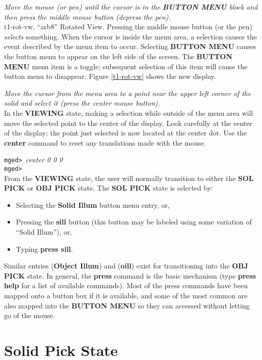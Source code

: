 \noindent
{\em Move the mouse (or pen) until the cursor is in the {\bf BUTTON MENU}
block and then press the middle mouse button (depress the pen).}\\

\mfig t1-rot-vw, ``arb8'' Rotated View.
Pressing the middle mouse button (or the pen) {\sl selects} something.
When the cursor is inside the menu area, a selection
causes the event described by the menu item to occur.
Selecting {\bf BUTTON MENU} causes the button menu to appear on the left
side of the screen. The {\bf BUTTON MENU} menu item is
a toggle; subsequent selection of this item will cause the button menu
to disappear.
Figure \ref{t1-rot-vw} shows the new display.

\noindent
{\em Move the cursor from the menu area to a point near the
upper left corner of the solid and select it (press the center mouse
button).}\\

In the {\bf VIEWING} state, making a selection while outside of the menu
area will move the selected point to the center of the display.  Look
carefully at the center of the display; the point just selected is now
located at the center dot. Use the {\bf center} command to reset any
translations made with the mouse.

\noindent
{\tt mged> }{\em center 0 0 0}\\
{\tt mged> }\\

From the {\bf VIEWING} state, the user will normally transition to either the
{\bf SOL PICK} or {\bf OBJ PICK} state.
The {\bf SOL PICK} state is selected by:
\begin{itemize}
\item Selecting the {\bf Solid Illum} button menu entry, or,
\item Pressing the {\bf sill} button (this button may be labeled
using some variation of ``Solid Illum''), or,
\item Typing {\bf press sill}.
\end{itemize}
Similar entries ({\bf Object Illum}) and ({\bf oill}) exist for transitioning
into the {\bf OBJ PICK} state.
In general, the {\bf press} command is the basic mechanism (type
{\bf press help} for a list of available commands).  Most of the press
commands have been mapped onto a button box if it is available,
 and some of the
most common are also mapped into the {\bf BUTTON MENU} so they can
accessed without letting go of the mouse.

\section{Solid Pick State}

